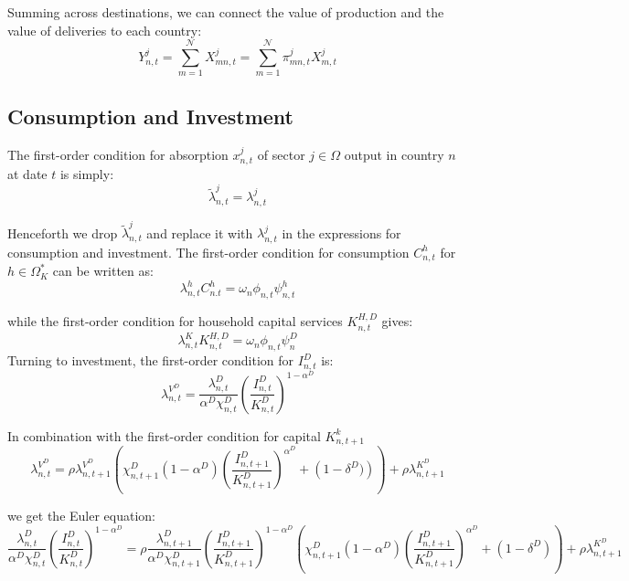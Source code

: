 \documentclass[12pt, bibtotoc, tablecaptionabove, figurecaptionabove, fleqn]{article}
\begin{document}
Summing across destinations, we can connect the value of production and the value of deliveries to each country:
\begin{equation*}
	Y_{n, t}^{j}=\sum_{m=1}^{\mathcal{N}} X_{m n, t}^{j}=\sum_{m=1}^{\mathcal{N}} \pi_{m n, t}^{j} X_{m, t}^{j}
\end{equation*}


\subsection{Consumption and Investment}
The first-order condition for absorption $x_{n, t}^{j}$ of sector $j \in \Omega$ output in country $n$ at date $t$ is
simply:
\begin{equation*}
	\tilde{\lambda}_{n, t}^{j}=\lambda_{n, t}^{j}
\end{equation*}

Henceforth we drop $\tilde{\lambda}_{n, t}^{j}$ and replace it with $\lambda_{n, t}^{j}$ in the expressions for consumption and investment.
The first-order condition for consumption $C_{n, t}^{h}$ for $h \in \Omega_{K}^{*}$ can be written as:
\begin{equation*}
	\lambda_{n, t}^{h} C_{n . t}^{h}=\omega_{n} \phi_{n, t} \psi_{n, t}^{h}
\end{equation*}

while the first-order condition for household capital services $K_{n, t}^{H, D}$ gives:
\begin{equation*}
\lambda_{n, t}^{K} K_{n, t}^{H, D}=\omega_{n} \phi_{n, t} \psi^{D}_n
\end{equation*}
Turning to investment, the first-order condition for $I_{n, t}^{D}$ is:
\begin{equation*}
	\lambda_{n, t}^{V^{D}}=\frac{\lambda_{n, t}^{D}}{\alpha^{D} \chi_{n, t}^{D}}\left(\frac{I_{n, t}^{D}}{K_{n, t}^{D}}\right)^{1-\alpha^D}
\end{equation*}

In combination with the first-order condition for capital $K_{n, t+1}^{k}$
\begin{equation*}
	\lambda_{n, t}^{V^{D}}=\rho \lambda_{n, t+1}^{V^{D}}\left(\chi_{n, t+1}^{D}\left(1-\alpha^D\right)\left(\frac{I_{n, t+1}^{D}}{K_{n, t+1}^{D}}\right)^{\alpha^D}+\left(1-\delta^{D})\right)\right)+\rho \lambda_{n, t+1}^{K^{D}}
\end{equation*}

we get the Euler equation:
\begin{equation*}
	\frac{\lambda_{n, t}^{D}}{\alpha^D \chi_{n, t}^{D}}\left(\frac{I_{n, t}^{D}}{K_{n, t}^{D}}\right)^{1-\alpha^D}=\rho \frac{\lambda_{n, t+1}^{D}}{\alpha^D \chi_{n, t+1}^{D}}\left(\frac{I_{n, t+1}^{D}}{K_{n, t+1}^{D}}\right)^{1-\alpha^D}\left(\chi_{n, t+1}^{D}\left(1-\alpha^D\right)\left(\frac{I_{n, t+1}^{D}}{K_{n, t+1}^{D}}\right)^{\alpha^D}+\left(1-\delta^{D}\right)\right)+\rho \lambda_{n, t+1}^{K^{D}}
\end{equation*}
\end{document}
